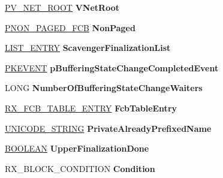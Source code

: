 \begin{DoxyCompactItemize}
\begin{tabbing}
\end{tabbing}\item 
\mbox{\label{struct___f_c_b_a8ddc44b41bbeb8d2ab056f6432f920dd}} 
\hyperlink{struct___v___n_e_t___r_o_o_t}{P\+V\+\_\+\+N\+E\+T\+\_\+\+R\+O\+OT} {\bfseries V\+Net\+Root}
\item 
\mbox{\label{struct___f_c_b_ad1068addc87317cb8801143180ee9af9}} 
\hyperlink{struct___n_o_n___p_a_g_e_d___f_c_b}{P\+N\+O\+N\+\_\+\+P\+A\+G\+E\+D\+\_\+\+F\+CB} {\bfseries Non\+Paged}
\item 
\mbox{\label{struct___f_c_b_afcc52a8eb1c2fe28ce27f9c061953b05}} 
\hyperlink{struct___l_i_s_t___e_n_t_r_y}{L\+I\+S\+T\+\_\+\+E\+N\+T\+RY} {\bfseries Scavenger\+Finalization\+List}
\item 
\mbox{\label{struct___f_c_b_a27a76216ef785b6cd161795a9e3e2ead}} 
\hyperlink{struct___k_e_v_e_n_t}{P\+K\+E\+V\+E\+NT} {\bfseries p\+Buffering\+State\+Change\+Completed\+Event}
\item 
\mbox{\label{struct___f_c_b_a34952a2c7594ce85de9d469aad0036ff}} 
L\+O\+NG {\bfseries Number\+Of\+Buffering\+State\+Change\+Waiters}
\item 
\mbox{\label{struct___f_c_b_ac594e5fbd4211db8ef6b9a151b5e6f8f}} 
\hyperlink{struct___r_x___f_c_b___t_a_b_l_e___e_n_t_r_y}{R\+X\+\_\+\+F\+C\+B\+\_\+\+T\+A\+B\+L\+E\+\_\+\+E\+N\+T\+RY} {\bfseries Fcb\+Table\+Entry}
\item 
\mbox{\label{struct___f_c_b_ae696372600e3ac0b8cdf182acd3bbdd7}} 
\hyperlink{struct___u_n_i_c_o_d_e___s_t_r_i_n_g}{U\+N\+I\+C\+O\+D\+E\+\_\+\+S\+T\+R\+I\+NG} {\bfseries Private\+Already\+Prefixed\+Name}
\item 
\mbox{\label{struct___f_c_b_a7945168e72664e94c422ba321686f203}} 
\hyperlink{_processor_bind_8h_a112e3146cb38b6ee95e64d85842e380a}{B\+O\+O\+L\+E\+AN} {\bfseries Upper\+Finalization\+Done}
\item 
\mbox{\label{struct___f_c_b_a1e80518764a2f88a386d317af98c60ec}} 
R\+X\+\_\+\+B\+L\+O\+C\+K\+\_\+\+C\+O\+N\+D\+I\+T\+I\+ON {\bfseries Condition}

\end{DoxyCompactItemize}
